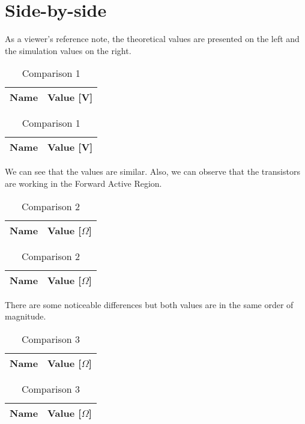 \section{Side-by-side}
\label{sec:sbs}

As a viewer's reference note, the theoretical values are presented on the left and the simulation values on the right.

\begin{table}[h]
\begin{center}
  \begin{tabular}{|c|c|}
    \hline    
    {\bf Name} & {\bf Value [V]} \\ \hline
    
    \hline
  \end{tabular}
  \begin{tabular}{|c||c|}
    \hline    
    {\bf Name} & {\bf Value [V]} \\ \hline
    
    \hline
  \end{tabular}
  \caption{Comparison 1}
  \label{tab:comparison 1}
\end{center}
\end{table}
\FloatBarrier

We can see that the values are similar. Also, we can observe that the transistors are working in the Forward Active Region.

\begin{table}[h]
\begin{center}
  \begin{tabular}{|c|c|}
    \hline    
    {\bf Name} & {\bf Value [$\Omega$]} \\ \hline
    
    \hline
  \end{tabular}
  \begin{tabular}{|c||c|}
    \hline    
    {\bf Name} & {\bf Value [$\Omega$]} \\ \hline
    
    \hline
  \end{tabular}
  \caption{Comparison 2}
  \label{tab:comparison 2}
\end{center}
\end{table}

There are some noticeable differences but both values are in the same order of magnitude.


\begin{table}[h]
\begin{center}
  \begin{tabular}{|c|c|}
    \hline    
    {\bf Name} & {\bf Value [$\Omega$]} \\ \hline
    
    \hline
  \end{tabular}
  \begin{tabular}{|c||c|}
    \hline    
    {\bf Name} & {\bf Value [$\Omega$]} \\ \hline
    
    \hline
  \end{tabular}
  \caption{Comparison 3}
  \label{tab:comparison 3}
\end{center}
\end{table}

